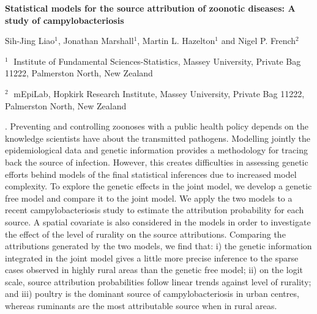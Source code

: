 \documentclass[12pt]{article}
\begin{document}
\begin{flushleft}


{\LARGE\bf Statistical models for the source attribution of zoonotic diseases: A study of campylobacteriosis}


\vspace{1.0cm}

Sih-Jing Liao$^1$, Jonathan Marshall$^1$, Martin L. Hazelton$^1$ and Nigel P. French$^2$

\begin{description}

\item $^1 \;$ Institute of Fundamental Sciences-Statistics, Massey University, Private Bag 11222, Palmerston North, New Zealand

\item $^2 \;$ mEpiLab, Hopkirk Research Institute, Massey University, Private Bag 11222, Palmerston North, New Zealand

\end{description}

\end{flushleft}


\vspace{0.75cm}

. Preventing and controlling zoonoses with a public health policy depends on the knowledge scientists have about the transmitted pathogens. Modelling jointly the epidemiological data and genetic information provides a methodology for tracing back the source of infection. However, this creates difficulties in assessing genetic efforts behind models of the final statistical inferences due to increased model complexity. To explore the genetic effects in the joint model, we develop a genetic free model and compare it to the joint model. We apply the two models to a recent campylobacteriosis study to estimate the attribution probability for each source. A spatial covariate is also considered in the models in order to investigate the effect of the level of rurality on the source attributions. Comparing the attributions generated by the two models, we find that: i) the genetic information integrated in the joint model gives a little more precise inference to the sparse cases observed in highly rural areas than the genetic free model; ii) on the logit scale, source attribution probabilities follow linear trends against level of rurality; and iii) poultry is the dominant source of campylobacteriosis in urban centres, whereas ruminants are the most attributable source when in rural areas.
\end{document}
